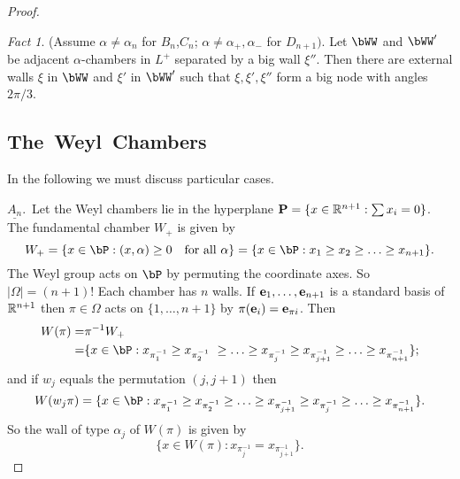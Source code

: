 \documentclass{memo-l}
\theoremstyle{definition}
\theoremstyle{remark}
\newtheorem{fact}{Fact}
\numberwithin{section}{chapter}
\numberwithin{equation}{chapter}
\begin{document}
\begin{proof}
\begin{fact} %
(Assume $\alpha\ne\alpha_n$ for $B_n$,$C_n$;
${\alpha}\ne {\alpha}_{+},{\alpha}_{-}$ for
$D_{n+1})$.  Let $\bWW$ and $\bWW'$ be adjacent ${\alpha}$-chambers
in $L^{+}$ separated by a big wall ${\xi''}$.  Then there are external walls
${\xi}$ in $\bWW$ and ${\xi}'$ in $\bWW'$ such that
${\xi},{\xi}',{\xi''}$ form a big node with angles $2{\pi}/3$.
\end{fact}

\medskip
\medskip

\subsection*{The\ Weyl\ Chambers}

   In the following we must discuss particular cases.

\noindent
$\underline{A_n}.$\  Let the Weyl chambers lie in the hyperplane 
${\bold	P} = \{ x  \in  {\Bbb R}^{n+1}: \sum x_{i} = 0\}$.  
The fundamental chamber	$W_{+}$ is given by 
$$
W_{+} = \{ x \in \bP: (x,{\alpha}) \ge 0\quad  {\text{for\ all}}\ 
{\alpha}\} = \{ x  \in  \bP: x_{1} \ge x_{2} \ge \ldots \ge x_{n+1}\}.
$$
The Weyl group acts on $\bP$ by permuting the coordinate axes.  So
$\vert {\Omega}\vert = (n+1)$!  Each chamber has $n$ walls.  If ${\bold
e_{1}},\ldots ,{\bold e_{n+1}}$ is a standard basis of ${\Bbb R}^{n+1}$
then ${\pi}  \in  {\Omega}$ acts on $\{1,\ldots ,n+1\}$ by 
${\pi}({\bold e_{i}}) = {\bold e_{{\pi}i}}$.  
Then 
$$\aligned
W({\pi}) =& {\pi}^{-1}W_{+} \\ =&
\{x  \in  \bP: x_{\pi_1^{-1}} \ge x_{\pi_2^{-1}}\ \ge \ldots \ge 
x_{\pi_j^{-1}} \ge x_{\pi_{j+1}^{-1}}  \ge \ldots \ge 
x_{\pi_{n+1}^{-1}}\};\endaligned
$$
and if $w_{j}$ equals the permutation $(j,j+1)$ then 
$$
W(w_j{\pi}) = \{ x \in \bP: x_{\pi_1^{-1}} \ge 
x_{\pi_2^{-1}} \ge \ldots \ge x_{\pi_{j+1}^{-1}} \ge x_{\pi_j^{-1}} 
\ge \ldots \ge x_{\pi_{n+1}^{-1}} \}.
$$
So the wall of type ${\alpha}_{j}$ of $W({\pi})$ is given by
$$
\{x  \in  W({\pi}): x_{\pi_j^{-1}} = x_{\pi_{j+1}^{-1}}\}.
$$



\end{proof}
\end{document}
